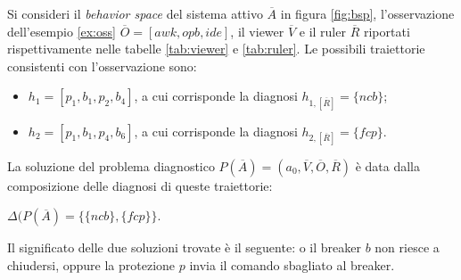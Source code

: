 \begin{ex} \label{ex:problem}
Si consideri il \emph{behavior space} del sistema attivo $\overline{A}$ in figura \ref{fig:bsp}, l'osservazione dell'esempio \ref{ex:oss} $\overline{O} = [awk, opb, ide]$, il viewer $\overline{V}$ e il ruler $\overline{R}$ riportati rispettivamente nelle tabelle \ref{tab:viewer} e \ref{tab:ruler}.
Le possibili traiettorie consistenti con l'osservazione sono:
\begin{itemize}
\item $h_1 = [p_1,b_1,p_2,b_4]$, a cui corrisponde la diagnosi $h_{1,[\overline{R}]} = \{ncb\}$;
\item $h_2 = [p_1,b_1,p_4,b_6]$, a cui corrisponde la diagnosi $h_{2,[\overline{R}]} = \{fcp\}$.
\end{itemize}
La soluzione del problema diagnostico $P(\overline{A}) = (a_0,\overline{V},\overline{O},\overline{R})$ è data dalla composizione delle diagnosi di queste traiettorie:
\begin{center}
$\Delta(P(\overline{A}) = \{\{ncb\},\{fcp\}\}$.
\end{center}
Il significato delle due soluzioni trovate è il seguente: o il breaker $b$ non riesce a chiudersi, oppure la protezione $p$ invia il comando sbagliato al breaker.  
\end{ex}


\newpage
